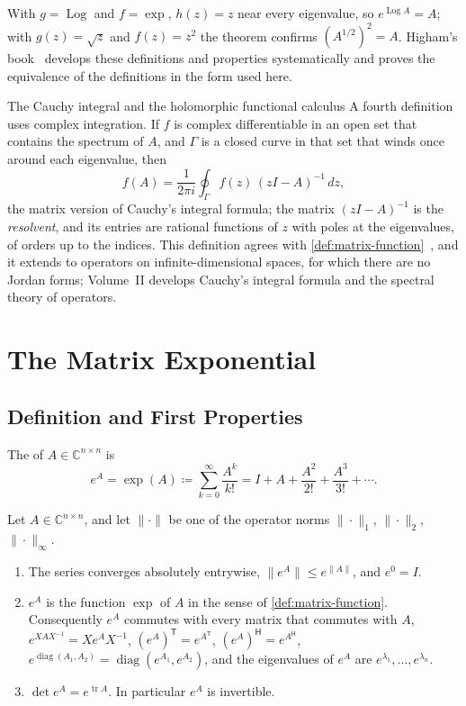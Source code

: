 With $g=\operatorname{Log}$ and $f=\exp$, $h(z)=z$ near every eigenvalue, so $e^{\operatorname{Log}A}=A$; with $g(z)=\sqrt z$ and $f(z)=z^2$ the theorem confirms $(A^{1/2})^2=A$. Higham's book~\cite[Chap.~1]{higham2008} develops these definitions and properties systematically and proves the equivalence of the definitions in the form used here.

\begin{note}{The Cauchy integral and the holomorphic functional calculus}
A fourth definition uses complex integration. If $f$ is complex differentiable in an open set that contains the spectrum of $A$, and $\Gamma$ is a closed curve in that set that winds once around each eigenvalue, then
\[
f(A)=\frac1{2\pi i}\oint_\Gamma f(z)\,(zI-A)^{-1}\,dz ,
\]
the matrix version of Cauchy's integral formula; the matrix $(zI-A)^{-1}$ is the \emph{resolvent}, and its entries are rational functions of $z$ with poles at the eigenvalues, of orders up to the indices. This definition agrees with \cref{def:matrix-function}~\cite[Sect.~1.2.3]{higham2008}, and it extends to operators on infinite-dimensional spaces, for which there are no Jordan forms; Volume~II develops Cauchy's integral formula and the spectral theory of operators.
\end{note}

\section{The Matrix Exponential}
\label{sec:matrix-exponential}

\subsection{Definition and First Properties}

\begin{definition}
\label{def:matrix-exponential}
The  of $A\in\mathbb C^{n\times n}$ is
\[
e^A=\exp(A)\coloneqq\sum_{k=0}^\infty\frac{A^k}{k!}=I+A+\frac{A^2}{2!}+\frac{A^3}{3!}+\cdots.
\]
\end{definition}

\begin{proposition}
\label{prop:exp-basic}
Let $A\in\mathbb C^{n\times n}$, and let $\|\cdot\|$ be one of the operator norms $\|\cdot\|_1$, $\|\cdot\|_2$, $\|\cdot\|_\infty$.
\begin{enumerate}
\item The series converges absolutely entrywise, $\|e^A\|\le e^{\|A\|}$, and $e^0=I$.
\item $e^A$ is the function $\exp$ of $A$ in the sense of \cref{def:matrix-function}. Consequently $e^A$ commutes with every matrix that commutes with $A$, $e^{XAX^{-1}}=Xe^AX^{-1}$, $(e^A)^{\mathsf T}=e^{A^{\mathsf T}}$, $(e^A)^{\mathsf H}=e^{A^{\mathsf H}}$, $e^{\operatorname{diag}(A_1,A_2)}=\operatorname{diag}(e^{A_1},e^{A_2})$, and the eigenvalues of $e^A$ are $e^{\lambda_1},\ldots,e^{\lambda_n}$.
\item $\det e^A=e^{\operatorname{tr}A}$. In particular $e^A$ is invertible.
\end{enumerate}
\end{proposition}

